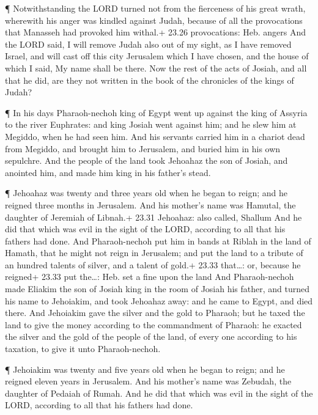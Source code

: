  ¶ Notwithstanding the LORD turned not from the fierceness
of his great wrath, wherewith his anger was kindled against Judah,
because of all the provocations that Manasseh had provoked him withal.+
23.26 provocations: Heb. angers  And the LORD said, I will
remove Judah also out of my sight, as I have removed Israel, and will
cast off this city Jerusalem which I have chosen, and the house of which
I said, My name shall be there.  Now the rest of the acts
of Josiah, and all that he did, are they not written in the book of the
chronicles of the kings of Judah?

 ¶ In his days Pharaoh-nechoh king of Egypt went up against
the king of Assyria to the river Euphrates: and king Josiah went against
him; and he slew him at Megiddo, when he had seen him.  And
his servants carried him in a chariot dead from Megiddo, and brought him
to Jerusalem, and buried him in his own sepulchre. And the people of the
land took Jehoahaz the son of Josiah, and anointed him, and made him
king in his father's stead.

 ¶ Jehoahaz was twenty and three years old when he began to
reign; and he reigned three months in Jerusalem. And his mother's name
was Hamutal, the daughter of Jeremiah of Libnah.+ 23.31 Jehoahaz: also
called, Shallum  And he did that which was evil in the
sight of the LORD, according to all that his fathers had done.
 And Pharaoh-nechoh put him in bands at Riblah in the land
of Hamath, that he might not reign in Jerusalem; and put the land to a
tribute of an hundred talents of silver, and a talent of gold.+ 23.33
that\ldots: or, because he reigned+ 23.33 put the\ldots: Heb. set a fine
upon the land  And Pharaoh-nechoh made Eliakim the son of
Josiah king in the room of Josiah his father, and turned his name to
Jehoiakim, and took Jehoahaz away: and he came to Egypt, and died there.
 And Jehoiakim gave the silver and the gold to Pharaoh; but
he taxed the land to give the money according to the commandment of
Pharaoh: he exacted the silver and the gold of the people of the land,
of every one according to his taxation, to give it unto Pharaoh-nechoh.

 ¶ Jehoiakim was twenty and five years old when he began to
reign; and he reigned eleven years in Jerusalem. And his mother's name
was Zebudah, the daughter of Pedaiah of Rumah.  And he did
that which was evil in the sight of the LORD, according to all that his
fathers had done.

